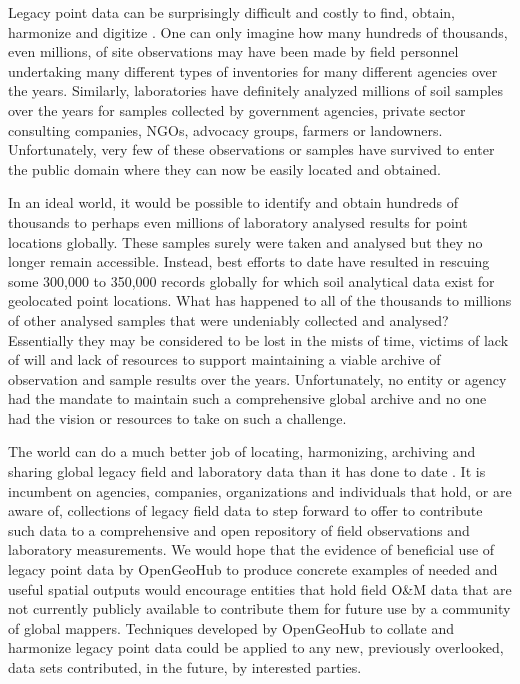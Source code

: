 \documentclass[graybox,natbib,nospthms,UStrade]{svmono}
\begin{document}
Legacy point data can be surprisingly difficult and costly to find,
obtain, harmonize and digitize \citep{arrouays2017soil}. One can only imagine how many hundreds
of thousands, even millions, of site observations may have been made by
field personnel undertaking many different types of inventories for many
different agencies over the years. Similarly, laboratories have
definitely analyzed millions of soil samples over the years for samples
collected by government agencies, private sector consulting companies,
NGOs, advocacy groups, farmers or landowners. Unfortunately, very few of
these observations or samples have survived to enter the public domain
where they can now be easily located and obtained.

In an ideal world, it would be possible to identify and obtain hundreds
of thousands to perhaps even millions of laboratory analysed results for
point locations globally. These samples surely were taken and analysed
but they no longer remain accessible. Instead, best efforts to date have
resulted in rescuing some 300,000 to 350,000 records globally for which
soil analytical data exist for geolocated point locations. What has
happened to all of the thousands to millions of other analysed samples
that were undeniably collected and analysed? Essentially they may be
considered to be lost in the mists of time, victims of lack of will and
lack of resources to support maintaining a viable archive of observation
and sample results over the years. Unfortunately, no entity or agency
had the mandate to maintain such a comprehensive global archive and no one had the
vision or resources to take on such a challenge.

The world can do a much better job of locating, harmonizing, archiving
and sharing global legacy field and laboratory data than it has done to
date \citep{arrouays2017soil}. It is incumbent on agencies, companies, organizations and
individuals that hold, or are aware of, collections of legacy field data
to step forward to offer to contribute such data to a comprehensive and
open repository of field observations and laboratory measurements. We
would hope that the evidence of beneficial use of legacy point data by
OpenGeoHub to produce concrete examples of needed and useful spatial
outputs would encourage entities that hold field O\&M data that are not
currently publicly available to contribute them for future use by a
community of global mappers. Techniques developed by OpenGeoHub to
collate and harmonize legacy point data could be applied to any new,
previously overlooked, data sets contributed, in the future, by
interested parties.
\end{document}
